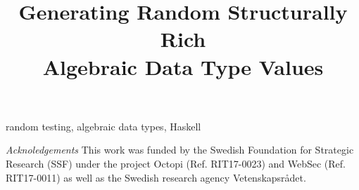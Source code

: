 \documentclass[conference, fleqn]{IEEEtran}
\begin{document}
\title{Generating Random Structurally Rich \\ Algebraic Data Type Values}

\author{
\and
{}
}

\maketitle


\newenvironment{CompactItemize}%
  {\begin{list}{$\, \  \blacktriangleright$}%
   {\leftmargin=0pt \itemsep=2pt \topsep=5pt
     \parsep=0pt \partopsep=0pt}}%
  {\end{list}}




\begin{IEEEkeywords}
random testing, algebraic data types, Haskell
\end{IEEEkeywords}










\emph{Acknoledgements} This work was funded by the Swedish Foundation for
Strategic Research (SSF) under the project Octopi (Ref. RIT17-0023) and WebSec
(Ref. RIT17-0011) as well as the Swedish research agency Vetenskapsr\r{a}det.




\end{document}
